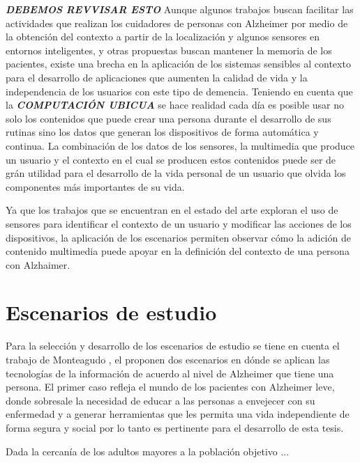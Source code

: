 \textit{\textbf{DEBEMOS REVVISAR ESTO}}
Aunque algunos trabajos buscan facilitar las actividades que realizan los cuidadores de personas con Alzheimer por medio de la obtención del contexto a partir de la localización y algunos sensores en entornos inteligentes, y otras propuestas buscan mantener la memoria de los pacientes, existe una brecha en la aplicación de los sistemas sensibles al contexto para el desarrollo de aplicaciones que aumenten la calidad de vida y la independencia de los usuarios con este tipo de demencia. Teniendo en cuenta que la \textbf{\textit{COMPUTACIÓN UBICUA}} se hace realidad cada día es posible usar no solo los contenidos que puede crear una persona durante el desarrollo de sus rutinas sino los datos que generan los dispositivos de forma automática y continua.
La combinación de los datos de los sensores, la multimedia que produce un usuario y el contexto en el cual se producen estos contenidos puede ser de grán utilidad para el desarrollo de la vida personal de un usuario que olvida los componentes más importantes de su vida.



Ya que los trabajos que se encuentran en el estado del arte exploran el uso de sensores para identificar el contexto de un usuario y modificar las acciones de los dispositivos, la aplicación de los escenarios permiten observar cómo la adición de contenido multimedia puede apoyar en la definición del contexto de una persona con Alzhaimer.

\section{Escenarios de estudio}
\label{sec:Escenarios_estudio}

Para la selección y desarrollo de los escenarios de estudio se tiene en cuenta el trabajo de Monteagudo \cite{monteagudo2014capacidades}, el proponen dos escenarios en dónde se aplican las tecnologías de la información de acuerdo al nivel de Alzheimer que tiene una persona. El primer caso refleja el mundo de los pacientes con Alzheimer leve, donde sobresale la necesidad de educar a las personas a envejecer con su enfermedad y a generar herramientas que les permita una vida independiente de forma segura y social por lo tanto es pertinente para el desarrollo de esta tesis.

Dada la cercanía de los adultos mayores a la población objetivo ...
\\

